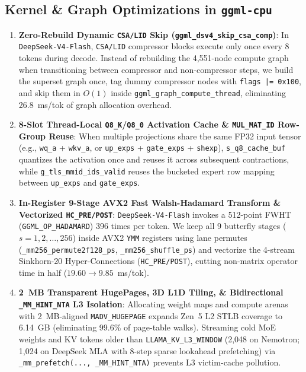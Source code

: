 \documentclass[10pt,twocolumn]{article}
\begin{document}
\subsection{Kernel \& Graph Optimizations in \texttt{ggml-cpu}}
\begin{enumerate}
    \item \textbf{Zero-Rebuild Dynamic \texttt{CSA/LID} Skip (\texttt{ggml\_dsv4\_skip\_csa\_comp})}: In \texttt{DeepSeek-V4-Flash}, \texttt{CSA/LID} compressor blocks execute only once every 8 tokens during decode. Instead of rebuilding the 4,551-node compute graph when transitioning between compressor and non-compressor steps, we build the superset graph once, tag dummy compressor nodes with \texttt{flags |= 0x100}, and skip them in $O(1)$ inside \texttt{ggml\_graph\_compute\_thread}, eliminating 26.8~ms/tok of graph allocation overhead.
    \item \textbf{8-Slot Thread-Local \texttt{Q8\_K}/\texttt{Q8\_0} Activation Cache \& \texttt{MUL\_MAT\_ID} Row-Group Reuse}: When multiple projections share the same FP32 input tensor (e.g., \texttt{wq\_a} + \texttt{wkv\_a}, or \texttt{up\_exps} + \texttt{gate\_exps} + \texttt{shexp}), \texttt{s\_q8\_cache\_buf} quantizes the activation once and reuses it across subsequent contractions, while \texttt{g\_tls\_mmid\_ids\_valid} reuses the bucketed expert row mapping between \texttt{up\_exps} and \texttt{gate\_exps}.
    \item \textbf{In-Register 9-Stage AVX2 Fast Walsh-Hadamard Transform \& Vectorized \texttt{HC\_PRE/POST}}: \texttt{DeepSeek-V4-Flash} invokes a 512-point FWHT (\texttt{GGML\_OP\_HADAMARD}) 396 times per token. We keep all 9 butterfly stages ($s = 1, 2, \dots, 256$) inside AVX2 \texttt{YMM} registers using lane permutes (\texttt{\_mm256\_permute2f128\_ps}, \texttt{\_mm256\_shuffle\_ps}) and vectorize the 4-stream Sinkhorn-20 Hyper-Connections (\texttt{HC\_PRE/POST}), cutting non-matrix operator time in half ($19.60 \to 9.85$~ms/tok).
    \item \textbf{2~MB Transparent HugePages, 3D L1D Tiling, \& Bidirectional \texttt{\_MM\_HINT\_NTA} L3 Isolation}: Allocating weight maps and compute arenas with 2~MB-aligned \texttt{MADV\_HUGEPAGE} expands Zen~5 L2 STLB coverage to 6.14~GB (eliminating 99.6\% of page-table walks). Streaming cold MoE weights and KV tokens older than \texttt{LLAMA\_KV\_L3\_WINDOW} (2,048 on Nemotron; 1,024 on DeepSeek MLA with 8-step sparse lookahead prefetching) via \texttt{\_mm\_prefetch(..., \_MM\_HINT\_NTA)} prevents L3 victim-cache pollution.

\end{enumerate}
\end{document}

